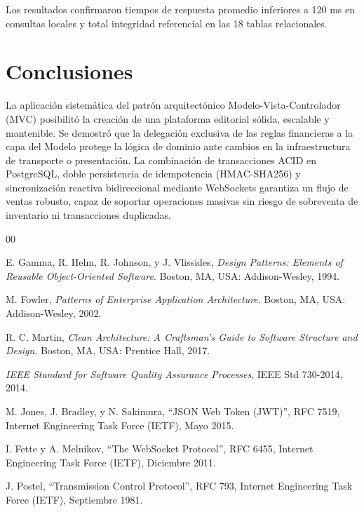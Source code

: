 \documentclass[conference]{IEEEtran}
\begin{document}
Los resultados confirmaron tiempos de respuesta promedio inferiores a 120 ms en consultas locales y total integridad referencial en las 18 tablas relacionales.

\section{Conclusiones}
La aplicación sistemática del patrón arquitectónico Modelo-Vista-Controlador (MVC) posibilitó la creación de una plataforma editorial sólida, escalable y mantenible. Se demostró que la delegación exclusiva de las reglas financieras a la capa del Modelo protege la lógica de dominio ante cambios en la infraestructura de transporte o presentación. La combinación de transacciones ACID en PostgreSQL, doble persistencia de idempotencia (HMAC-SHA256) y sincronización reactiva bidireccional mediante WebSockets garantiza un flujo de ventas robusto, capaz de soportar operaciones masivas sin riesgo de sobreventa de inventario ni transacciones duplicadas.

\begin{thebibliography}{00}

E. Gamma, R. Helm, R. Johnson, y J. Vlissides, \textit{Design Patterns: Elements of Reusable Object-Oriented Software}. Boston, MA, USA: Addison-Wesley, 1994.

M. Fowler, \textit{Patterns of Enterprise Application Architecture}. Boston, MA, USA: Addison-Wesley, 2002.

R. C. Martin, \textit{Clean Architecture: A Craftsman's Guide to Software Structure and Design}. Boston, MA, USA: Prentice Hall, 2017.

\textit{IEEE Standard for Software Quality Assurance Processes}, IEEE Std 730-2014, 2014.

M. Jones, J. Bradley, y N. Sakimura, ``JSON Web Token (JWT)'', RFC 7519, Internet Engineering Task Force (IETF), Mayo 2015.

I. Fette y A. Melnikov, ``The WebSocket Protocol'', RFC 6455, Internet Engineering Task Force (IETF), Diciembre 2011.

J. Postel, ``Transmission Control Protocol'', RFC 793, Internet Engineering Task Force (IETF), Septiembre 1981.

\end{thebibliography}
\end{document}
